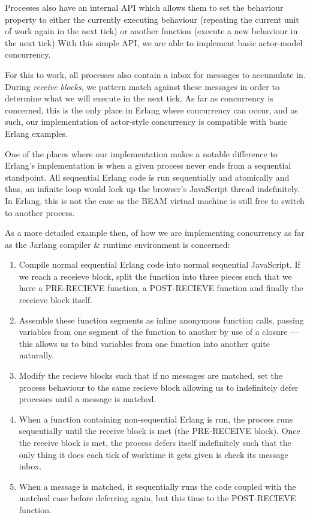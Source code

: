 \documentclass[twoside,12pt,titlepage,a4paper]{article}
\begin{document}
Processes also have an internal API which allows them to set the behaviour property to either the currently executing behaviour (repeating the current unit of work again in the next tick) or another function (execute a new behaviour in the next tick) With this simple API, we are able to implement basic actor-model concurrency.

For this to work, all processes also contain a inbox for messages to accumulate in. During \textit{receive blocks}, we pattern match against these messages in order to determine what we will execute in the next tick. As far as concurrency is concerned, this is the only place in Erlang where concurrency can occur, and as such, our implementation of actor-style concurrency is compatible with basic Erlang examples.

One of the places where our implementation makes a notable difference to Erlang's implementation is when a given process never ends from a sequential standpoint. All sequential Erlang code is run sequentially and atomically and thus, an infinite loop would lock up the browser's JavaScript thread indefinitely. In Erlang, this is not the case as the BEAM virtual machine is still free to switch to another process.

As a more detailed example then, of how we are implementing concurrency as far as the Jarlang compiler \& runtime environment is concerned: 

\begin{enumerate}
	\item Compile normal sequential Erlang code into normal sequential JavaScript. If we reach a receieve block, split the function into three pieces such that we have a PRE-RECIEVE function, a POST-RECIEVE function and finally the receieve block itself.
	\item Assemble these function segments as inline anonymous function calls, passing variables from one segment of the function to another by use of a closure --- this allows us to bind variables from one function into another quite naturally.
	\item Modify the recieve blocks such that if no messages are matched, set the process behaviour to the same recieve block allowing us to indefinitely defer processes until a message is matched.
	\item When a function containing non-sequential Erlang is run, the process runs sequentially until the receive block is met (the PRE-RECEIVE block). Once the receive block is met, the process defers itself indefinitely such that the only thing it does each tick of worktime it gets given is check its message inbox.
	\item When a message is matched, it sequentially runs the code coupled with the matched case before deferring again, but this time to the POST-RECIEVE function.
\end{enumerate}
\end{document}
